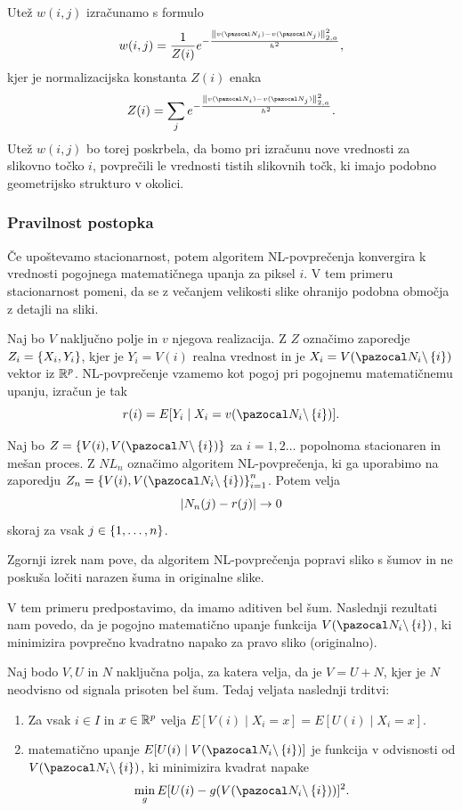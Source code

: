 Utež $w(i, j)$ izračunamo s formulo
%
$$w(i, j) = \frac{1}{Z(i)} e^{-\frac{\norm{v(\NN_i) - v(\NN_j)}_{2, a}^2}{h^2}},$$
%
kjer je normalizacijska konstanta $Z(i)$ enaka
%
$$Z(i) = \sum_j  e^{-\frac{\norm{v(\NN_i) - v(\NN_j)}_{2, a}^2}{h^2}}.$$
%
Utež $w(i, j)$ bo torej poskrbela, da bomo pri izračunu nove vrednosti za slikovno točko $i$, povprečili le vrednosti tistih slikovnih točk, ki imajo podobno geometrijsko strukturo v okolici.
%
\begin{primer}
\end{primer}
%
\subsubsection{Pravilnost postopka}
Če upoštevamo stacionarnost, potem algoritem NL-povprečenja konvergira k vrednosti pogojnega matematičnega upanja za piksel $i$. V tem primeru stacionarnost pomeni, da se z večanjem velikosti slike ohranijo podobna območja z detajli na sliki.

Naj bo $V$ naključno polje in $v$ njegova realizacija. Z $Z$ označimo zaporedje $Z_i = \left\{X_i, Y_i\right\}$, kjer je $Y_i = V(i)$ realna vrednost in je $X_i = V(\NN_i\backslash\set{i})$ vektor iz $\mathbb R ^p$. NL-povprečenje vzamemo kot pogoj pri pogojnemu matematičnemu upanju, izračun je tak
$$r(i) = E[Y_i \mid X_i = v(\NN_i\backslash\set{i})].$$

\begin{izrek}
Naj bo $Z = \set{V(i), V(\NN\backslash \set{i})}$ za $i = 1, 2 \ldots$ popolnoma stacionaren in mešan proces. Z $NL_n$ označimo algoritem NL-povprečenja, ki ga uporabimo na zaporedju $Z_n = \set{V(i), V(\NN_i \backslash \set{i})}_{i=1}^n$. Potem velja
$$\left|N_n(j) - r(j)\right| \to 0$$
skoraj za vsak $j \in \left\{1, \ldots, n\right\}$.
\end{izrek}

Zgornji izrek nam pove, da algoritem NL-povprečenja popravi sliko s šumov in ne poskuša ločiti narazen šuma in originalne slike.

V tem primeru predpostavimo, da imamo aditiven bel šum. Naslednji rezultati nam povedo, da je pogojno matematično upanje funkcija $V(\NN_i\backslash \set{i})$, ki minimizira povprečno kvadratno napako za pravo sliko (originalno).

\begin{izrek}
Naj bodo $V, U$ in $N$ naključna polja, za katera velja, da je $V = U + N$, kjer je $N$ neodvisno od signala prisoten bel šum. Tedaj veljata naslednji trditvi:
\begin{enumerate}
\item Za vsak $i \in I$ in $x \in \mathbb R^p$ velja $E[V(i) \mid X_i = x] = E[U(i) \mid X_i = x]$.
\item matematično upanje $E[U(i) \mid V(\NN_i \backslash \set{i})]$ je funkcija v odvisnosti od $V(\NN_i \backslash \set{i})$, ki minimizira kvadrat napake
$$\min_g E[U(i) - g(V(\NN_i \backslash \set{i}))]^2.$$
\end{enumerate}
\end{izrek}
%
